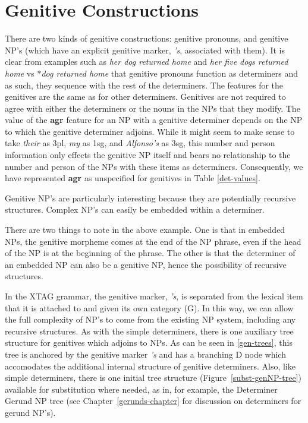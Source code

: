 \section{Genitive Constructions}
\label{genitives}        

There are two kinds of genitive constructions: genitive pronouns, and genitive
NP's (which have an explicit genitive marker, {\it 's}, associated with them).
It is clear from examples such as {\it her dog returned home\/} and
{\it her five dogs returned home} vs {\it
$\ast$dog returned home\/} that genitive pronouns function as determiners and as
such, they sequence with the rest of the determiners.  The features for the
genitives are the same as for other determiners.  Genitives are not required to agree with
either the determiners or the nouns in the NPs that they modify. The
value of the {\bf agr} feature for an NP with a genitive determiner
depends on the NP to which the genitive determiner adjoins. While it
might seem to make sense to take {\it their} as 3pl, {\it my} as 1sg,
and {\it Alfonso's} as 3sg, this number and person information only
effects the genitive NP itself and bears no relationship to the number
and person of the NPs with these items as determiners. Consequently,
we have represented {\bf agr} as unspecified for genitives in Table
\ref{det-values}.

Genitive NP's are particularly interesting because they are potentially
recursive structures.  Complex NP's can easily be embedded within a determiner.


There are two things to note in the above example.  One is that in embedded
NPs, the genitive morpheme comes at the end of the NP phrase, even if the head
of the NP is at the beginning of the phrase.  The other is that the determiner
of an embedded NP can also be a genitive NP, hence the possibility of recursive
structures.

In the XTAG grammar, the genitive marker, {\it 's}, is separated from the
lexical item that it is attached to and given its own category (G).  In
this way, we can allow the full complexity of NP's to come from the
existing NP system, including any recursive structures.  As with the simple
determiners, there is one auxiliary tree structure for genitives which
adjoins to NPs. As can be seen in \ref{gen-trees}, this tree is anchored by
the genitive marker {\it 's} and has a branching D node which accomodates
the additional internal structure of genitive determiners. Also, like simple
determiners, there is one initial tree structure
(Figure~\ref{subst-genNP-tree}) available for substitution where needed, as
in, for example, the Determiner Gerund NP tree (see
Chapter~\ref{gerunds-chapter} for discussion on determiners for gerund
NP's).

